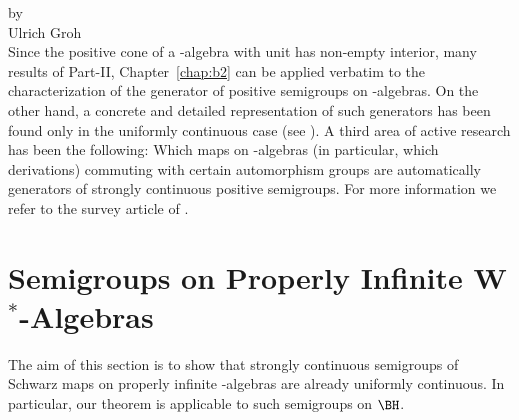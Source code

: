 \setcounter{section}{0}
\label{chap:d2}
\thispagestyle{empty}
{\Large
\vspace*{-.75cm}
by \\[.25em]
Ulrich Groh
\vspace{.75cm}
\\
}
Since the positive cone of a \CA-algebra with unit has non-empty interior, many results of Part-II, Chapter~\ref{chap:b2} can be applied verbatim to the characterization of the generator of positive semigroups on \CA-algebras.
On the other hand, a concrete and detailed representation of such generators has been found only in the uniformly continuous case (see \textcite{lindblad:1976}).
A third area of active research has been the following: Which maps on \CA-algebras (in particular, which derivations) commuting with certain automorphism groups are automatically generators of strongly continuous positive semigroups.
For more information we refer to the survey article of \textcite{evans:1984}.
\section{Semigroups on Properly Infinite \texorpdfstring{W$^{*}$-Algebras}{W\textsuperscript{*}-Algebras}}
The aim of this section is to show that strongly continuous semigroups of Schwarz maps on properly infinite \WA-algebras are already uniformly continuous.
In particular, our theorem is applicable to such semigroups on $\BH$.

